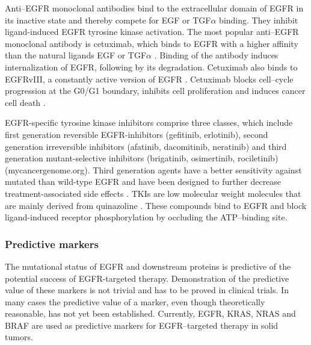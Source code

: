 {{      Anti--EGFR monoclonal antibodies bind to the extracellular domain of
      EGFR in its inactive state and thereby compete for EGF or TGF$\alpha$
      binding. They inhibit ligand-induced EGFR tyrosine kinase activation. The
      most popular anti--EGFR monoclonal antibody is cetuximab, which binds to
      EGFR with a higher affinity than the natural ligands EGF or TGF$\alpha$ {\cite{cetuxi}}.
      Binding of the antibody induces internalization of EGFR, following by its
      degradation. Cetuximab also binds to EGFRvIII, a constantly active
      version of EGFR {\cite{cetuxi_2}}. Cetuximab blocks cell--cycle  progression at the G0/G1
      boundary, inhibits cell proliferation and induces cancer cell death {\cite{cetuxi_3}}.

      EGFR-specific tyrosine kinase inhibitors comprise three classes, which
      include first generation reversible  EGFR-inhibitors (gefitinib,
      erlotinib), second generation irreversible inhibitors (afatinib,
      dacomitinib, neratinib) and third generation mutant-selective inhibitors
      (brigatinib, osimertinib, rociletinib) (mycancergenome.org). Third generation agents have a
      better sensitivity against mutated than wild-type EGFR and have been
      designed to further decrease treatment-associated side effects {\cite{tki}}. TKIs are
      low molecular weight molecules that are mainly derived from quinazoline {\cite{tki_2}}.
      These compounds bind to EGFR and block ligand-induced receptor
      phosphorylation by occluding the ATP--binding site.

    \subsubsection{Predictive markers}

      The mutational status of EGFR and downstream proteins is predictive of the
      potential success of EGFR-targeted therapy. Demonstration of the
      predictive value of these markers is not trivial and has to be proved in
      clinical trials. In many cases the predictive value of a marker, even
      though theoretically reasonable, has not yet been established. Currently,
      EGFR, KRAS, NRAS and BRAF are  used as predictive markers for
      EGFR--targeted therapy in solid tumors.

}}
